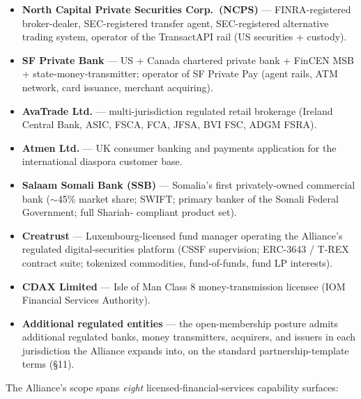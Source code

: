 \begin{itemize}[leftmargin=2em,itemsep=0.1em]
\item \textbf{North Capital Private Securities Corp.\ (NCPS)} ---
FINRA-registered broker-dealer, SEC-registered transfer agent,
SEC-registered alternative trading system, operator of the
TransactAPI rail (US securities + custody).
\item \textbf{SF Private Bank} --- US + Canada chartered private bank
+ FinCEN MSB + state-money-transmitter; operator of SF Private Pay
(agent rails, ATM network, card issuance, merchant acquiring).
\item \textbf{AvaTrade Ltd.} --- multi-jurisdiction regulated retail
brokerage (Ireland Central Bank, ASIC, FSCA, FCA, JFSA, BVI FSC,
ADGM FSRA).
\item \textbf{Atmen Ltd.} --- UK consumer banking and payments
application for the international diaspora customer base.
\item \textbf{Salaam Somali Bank (SSB)} --- Somalia's first
privately-owned commercial bank ($\sim$45\% market share; SWIFT;
primary banker of the Somali Federal Government; full Shariah-
compliant product set).
\item \textbf{Creatrust} --- Luxembourg-licensed fund manager
operating the Alliance's regulated digital-securities platform
(CSSF supervision; ERC-3643 / T-REX contract suite; tokenized
commodities, fund-of-funds, fund LP interests).
\item \textbf{CDAX Limited} --- Isle of Man Class 8 money-transmission
licensee (IOM Financial Services Authority).
\item \textbf{Additional regulated entities} --- the open-membership
posture admits additional regulated banks, money transmitters,
acquirers, and issuers in each jurisdiction the Alliance expands
into, on the standard partnership-template terms (\S 11).
\end{itemize}

The Alliance's scope spans \emph{eight} licensed-financial-services
capability surfaces:

